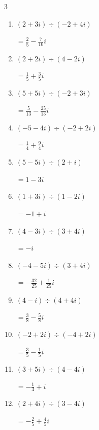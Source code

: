 \begin{multicols}{3}
\begin{enumerate}
  \item $\displaystyle (2+3i)\div(-2+4i)$

        $\displaystyle =\frac{2}{5}-\frac{7}{10}i$

\columnbreak %

\resetques

  \item $\displaystyle (2+2i)\div(4-2i)$

        $\displaystyle =\frac{1}{5}+\frac{3}{5}i$

  \item $\displaystyle (5+5i)\div(-2+3i)$

        $\displaystyle =\frac{5}{13}-\frac{25}{13}i$

  \item $\displaystyle (-5-4i)\div(-2+2i)$

        $\displaystyle =\frac{1}{4}+\frac{9}{4}i$

  \item $\displaystyle (5-5i)\div(2+i)$

        $\displaystyle =1-3i$

  \item $\displaystyle (1+3i)\div(1-2i)$

        $\displaystyle =-1+i$

  \item $\displaystyle (4-3i)\div(3+4i)$

        $\displaystyle =-i$

  \item $\displaystyle (-4-5i)\div(3+4i)$

        $\displaystyle =-\frac{32}{25}+\frac{1}{25}i$

  \item $\displaystyle (4-i)\div(4+4i)$

        $\displaystyle =\frac{3}{8}-\frac{5}{8}i$

  \item $\displaystyle (-2+2i)\div(-4+2i)$

        $\displaystyle =\frac{3}{5}-\frac{1}{5}i$

  \item $\displaystyle (3+5i)\div(4-4i)$

        $\displaystyle =-\frac{1}{4}+i$

\columnbreak %

  \item $\displaystyle (2+4i)\div(3-4i)$

        $\displaystyle =-\frac{2}{5}+\frac{4}{5}i$


\end{enumerate}
\end{multicols}
